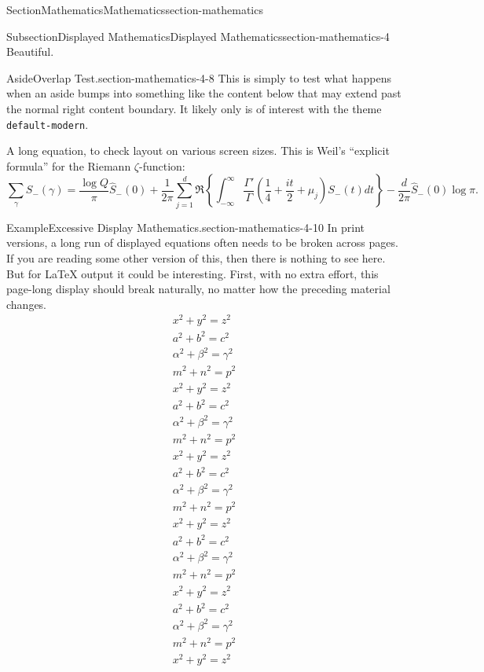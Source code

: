 \documentclass[twoside,10pt,]{article}
\newcommand{\mono}[1]{\texttt{#1}}
\numberwithin{equation}{section}
\begin{document}
\begin{sectionptx}{Section}{Mathematics}{}{Mathematics}{}{}{section-mathematics}
\begin{subsectionptx}{Subsection}{Displayed Mathematics}{}{Displayed Mathematics}{}{}{section-mathematics-4}
Beautiful.%
\begin{aside}{Aside}{Overlap Test.}{section-mathematics-4-8}%
This is simply to test what happens when an aside bumps into something like the content below that may extend past the normal right content boundary. It likely only is of interest with the theme \mono{default-modern}.%
\end{aside}
A long equation, to check layout on various screen sizes.  This is Weil's ``explicit formula'' for the Riemann \(\zeta\)-function:%
\begin{equation}
\sum_\gamma S_-(\gamma) = \frac{\log Q}{\pi} \hat S_-(0)
+ \frac{1}{2\pi} \sum_{j=1}^d \Re\left\{ \int_{-\infty}^\infty \frac{\Gamma'}{\Gamma}\left(\frac{1}{4} + \frac{it}{2} + \mu_j\right)S_-(t) dt\right\}
- \frac{d}{2\pi}\hat S_-(0)\log \pi\text{.}\label{section-mathematics-4-9-3}
\end{equation}
%
\begin{example}{Example}{Excessive Display Mathematics.}{section-mathematics-4-10}%
In print versions, a long run of displayed equations often needs to be broken across pages.  If you are reading some other version of this, then there is nothing to see here.  But for \LaTeX{} output it could be interesting.  First, with no extra effort, this page-long display should break naturally, no matter how the preceding material changes.%
\begin{gather*}
x^2+y^2=z^2\\
a^2+b^2=c^2\\
\alpha^2+\beta^2=\gamma^2\\
m^2+n^2=p^2\\
x^2+y^2=z^2\\
a^2+b^2=c^2\\
\alpha^2+\beta^2=\gamma^2\\
m^2+n^2=p^2\\
x^2+y^2=z^2\\
a^2+b^2=c^2\\
\alpha^2+\beta^2=\gamma^2\\
m^2+n^2=p^2\\
x^2+y^2=z^2\\
a^2+b^2=c^2\\
\alpha^2+\beta^2=\gamma^2\\
m^2+n^2=p^2\\
x^2+y^2=z^2\\
a^2+b^2=c^2\\
\alpha^2+\beta^2=\gamma^2\\
m^2+n^2=p^2\\
x^2+y^2=z^2\\

\end{gather*}
\end{example}
\end{subsectionptx}
\end{sectionptx}
\end{document}
